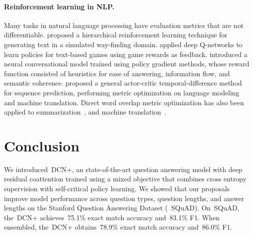 \documentclass{article} \usepackage{iclr2018_conference,times}
\newcommand{\modelname}{DCN+\xspace}
\newcommand{\squad}{SQuAD\xspace}
\newcommand{\emours}{75.1\%\xspace}
\newcommand{\fours}{83.1\%\xspace}
\newcommand{\emoursensemble}{78.9\%\xspace}
\newcommand{\foursensemble}{86.0\%\xspace}
\begin{document}
\paragraph{Reinforcement learning in NLP.}
Many tasks in natural language processing have evaluation metrics that are not differentiable.
\citet{dethlefs2011combining} proposed a hierarchical reinforcement learning technique for generating text in a simulated way-finding domain.
\citet{Narasimhan2015LanguageUF} applied deep Q-networks to learn policies for text-based games using game rewards as feedback.
\citet{li2016deep} introduced a neural conversational model trained using policy gradient methods, whose reward function consisted of heuristics for ease of answering, information flow, and semantic coherence.
\citet{Bahdanau2016AnAA} proposed a general actor-critic temporal-difference method for sequence prediction, performing metric optimization on language modeling and machine translation.
Direct word overlap metric optimization has also been applied to summarization~\citep{Paulus2017ADR}, and machine translation~\citep{wu2016google}.





\section{Conclusion}
\vspace{-2mm}



We introduced~\modelname, an state-of-the-art question answering model with deep residual coattention trained using a mixed objective that combines cross entropy supervision with self-critical policy learning.
We showed that our proposals improve model performance across question types, question lengths, and answer lengths on the Stanford Question Answering Dataset (~\squad).
On~\squad, the~\modelname achieves~\emours exact match accuracy and~\fours F1.
When ensembled, the~\modelname obtains~\emoursensemble exact match accuracy and~\foursensemble F1.




\end{document}
